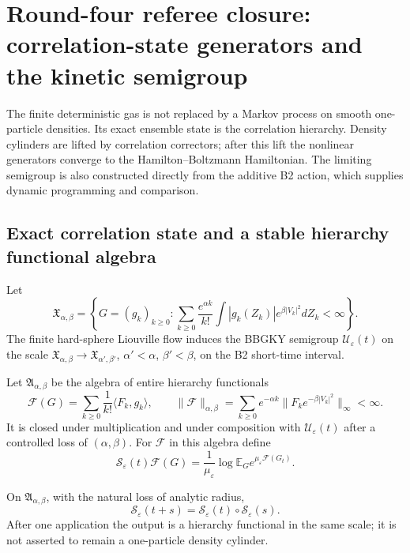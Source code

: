 \section{Round-four referee closure: correlation-state generators and the kinetic semigroup}
\label{sec:r3-b4}

The finite deterministic gas is not replaced by a Markov process on smooth
one-particle densities.  Its exact ensemble state is the correlation
hierarchy.  Density cylinders are lifted by correlation correctors; after this
lift the nonlinear generators converge to the Hamilton--Boltzmann Hamiltonian.
The limiting semigroup is also constructed directly from the additive B2
action, which supplies dynamic programming and comparison.

\subsection{Exact correlation state and a stable hierarchy functional algebra}

Let
\[
 \mathfrak X_{\alpha,\beta}
 =\left\{G=(g_k)_{k\ge0}:
 \sum_{k\ge0}\frac{e^{\alpha k}}{k!}
 \int|g_k(Z_k)|e^{\beta|V_k|^2}dZ_k<\infty\right\}.
\]
The finite hard-sphere Liouville flow induces the BBGKY semigroup
\(\mathscr U_\varepsilon(t)\) on the scale
\(\mathfrak X_{\alpha,\beta}\to\mathfrak X_{\alpha',\beta'}\),
\(\alpha'<\alpha\), \(\beta'<\beta\), on the B2 short-time interval.

Let \(\mathfrak A_{\alpha,\beta}\) be the algebra of entire hierarchy
functionals
\[
 \mathcal F(G)=
 \sum_{k\ge0}\frac1{k!}\langle F_k,g_k\rangle,
 \qquad
 \|\mathcal F\|_{\alpha,\beta}
 =\sum_{k\ge0}e^{-\alpha k}
 \|F_ke^{-\beta|V_k|^2}\|_\infty<\infty.
\]
It is closed under multiplication and under composition with
\(\mathscr U_\varepsilon(t)\) after a controlled loss of \((\alpha,\beta)\).
For \(\mathcal F\) in this algebra define
\[
 \mathscr S_\varepsilon(t)\mathcal F(G)
 =\frac1{\mu_\varepsilon}
 \log\mathbb E_G
 e^{\mu_\varepsilon\mathcal F(G_t)}.
\]

\begin{proposition}
\label{prop:r3-b4-hierarchy}
On \(\mathfrak A_{\alpha,\beta}\), with the natural loss of analytic radius,
\[
 \mathscr S_\varepsilon(t+s)
 =\mathscr S_\varepsilon(t)\circ
 \mathscr S_\varepsilon(s).
\]
After one application the output is a hierarchy functional in the same scale;
it is not asserted to remain a one-particle density cylinder.
\end{proposition}

